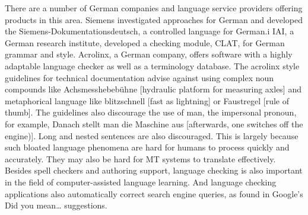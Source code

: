 \documentclass[]{../metanetpaper}
\begin{document}
There are a number of German companies and language service providers offering products in this area. Siemens investigated approaches for German and developed the Siemens-Dokumentationsdeutsch, a controlled language for German.i IAI, a German research institute, developed a checking module, CLAT, for German grammar and style. Acrolinx, a German company, offers software with a highly adaptable language checker as well as a terminology database. The acrolinx style guidelines for technical documentation advise against using complex noun compounds like Achsmesshebebühne [hydraulic platform for measuring axles] and metaphorical language like blitzschnell [fast as lightning] or Faustregel [rule of thumb]. The guidelines also discourage the use of man, the impersonal pronoun, for example, Danach stellt man die Maschine aus [afterwards, one switches off the engine)]. Long and nested sentences are also discouraged. This is largely because such bloated language phenomena are hard for humans to process quickly and accurately. They may also be hard for MT systems to translate effectively.
Besides spell checkers and authoring support, language checking is also important in the field of computer-assisted language learning. And language checking applications also automatically correct search engine queries, as found in Google's Did you mean… suggestions. 
\end{document}

